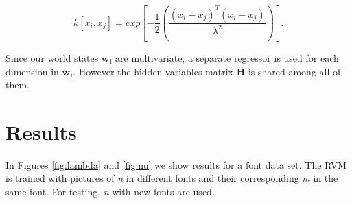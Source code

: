 \documentclass[12pt]{article}
\begin{document}
\begin{equation}
\label{eq:kernel}
k[x_i, x_j] = exp \left[ - \frac{1}{2} \left( \frac{(x_i - x_j)^T (x_i - x_j)}{\lambda^2} \right) \right].
\end{equation}

Since our world states $\mathbf{w_i}$ are multivariate, a separate regressor is used for each dimension in  $\mathbf{w_i}$.
However the hidden variables matrix $\mathbf{H}$ is shared among all of them.

\section{Results}

In Figures \ref{fig:lambda} and \ref{fig:nu} we show results for a font data set.
The RVM is trained with pictures of \emph{n} in different fonts and their corresponding \emph{m} in the same font.
For testing, \emph{n} with new fonts are used.
\end{document}
